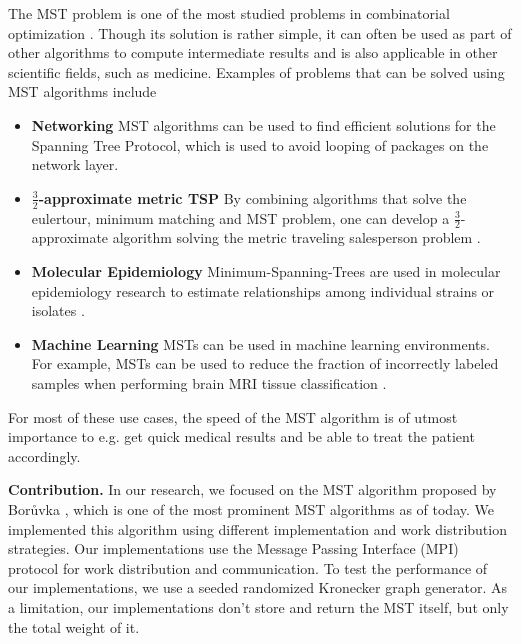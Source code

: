 \documentclass[letterpaper]{article}
\newcommand{\mypar}[1]{{\bf #1.}}
\begin{document}
The MST problem is one of the most studied problems in combinatorial optimization \cite{graham1985history}. Though its
solution is rather simple, it can often be used as part of other algorithms to compute intermediate results and is also
applicable in other scientific fields, such as medicine. Examples of problems that can be solved using MST algorithms
include
\begin{itemize}
  \item \textbf{Networking} MST algorithms can be used to find efficient solutions for the Spanning Tree Protocol, which
    is used to avoid looping of packages on the network layer.
  \item \textbf{$\frac{3}{2}$-ap\-prox\-i\-mate metric TSP} By combining algorithms that solve the eulertour, minimum
    matching and MST problem, one can develop a $\frac{3}{2}$-ap\-prox\-i\-mate algorithm solving the metric traveling
    salesperson problem \cite{christofides1976worst}.
  \item \textbf{Molecular Epidemiology} Minimum-Spanning-Trees are used in molecular epidemiology research to estimate
    relationships among individual strains or isolates \cite{spada2004use, salipante2011inadequacies}.
  \item \textbf{Machine Learning} MSTs can be used in machine learning environments. For example, MSTs can be used to
    reduce the fraction of incorrectly labeled samples when performing brain MRI tissue classification
    \cite{cocosco2003fully}.
\end{itemize}
For most of these use cases, the speed of the MST algorithm is of utmost importance to e.g. get quick medical results
and be able to treat the patient accordingly.

\mypar{Contribution}
In our research, we focused on the MST algorithm proposed by Bor\r{u}vka \cite{boruuvka1926jistem,
nevsetvril2001otakar}, which is one of the most prominent MST algorithms as of today. We implemented this algorithm
using different implementation and work distribution strategies. Our implementations use the Message Passing Interface
(MPI) protocol for work distribution and communication. To test the performance of our implementations, we use a seeded
randomized Kronecker graph generator.
As a limitation, our implementations don't store and return the MST itself, but only the total weight of it.
\end{document}
